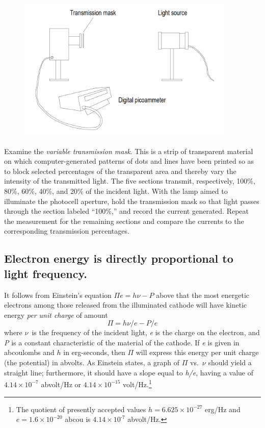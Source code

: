 \begin{figure}[h]
\centering
  \includegraphics[width=4.08333in,height=2.77083in]{images/06_einstein/001.png}
\end{figure}

Examine the \emph{variable transmission mask}. This is a strip of
transparent material on which computer-generated patterns of dots and
lines have been printed so as to block selected percentages of the
transparent area and thereby vary the intensity of the transmitted
light. The five sections transmit, respectively, 100\%, 80\%, 60\%,
40\%, and 20\% of the incident light. With the lamp aimed to illuminate
the photocell aperture, hold the transmission mask so that light passes
through the section labeled ``100\%,'' and record the current generated.
Repeat the measurement for the remaining sections and compare the
currents to the corresponding transmission percentages.

\subsection{Electron energy is directly proportional to light frequency.}

It follows from Einstein's equation $\Pi e = h\nu - P$
above that the most energetic electrons among those released from the
illuminated cathode will have kinetic energy \emph{per unit charge} of
amount
\begin{equation*}
\Pi = h\nu/e - P/e
\end{equation*}
where $\nu$~is the frequency of the incident light, \emph{e} is the
charge on the electron, and \emph{P} is a constant characteristic of the
material of the cathode. If \emph{e} is given in abcoulombs and $h$
in erg-seconds, then $\Pi$ will express this energy per unit charge
(the potential) in abvolts. As Einstein states, a
graph of $\Pi$ vs.\ $\nu$ should yield a straight line;
furthermore, it should have a slope equal to \emph{h/e}, having a value
of $4.14\times 10^{-7}$ abvolt/Hz or $4.14\times 10^{-15}$ volt/Hz.\footnote{The
  quotient of presently accepted values $h = 6.625\times 10^{-27}$ erg/Hz
  and $e = 1.6\times 10^{-20}$ abcou is $4.14\times 10^{‑7}$ abvolt/Hz.}

